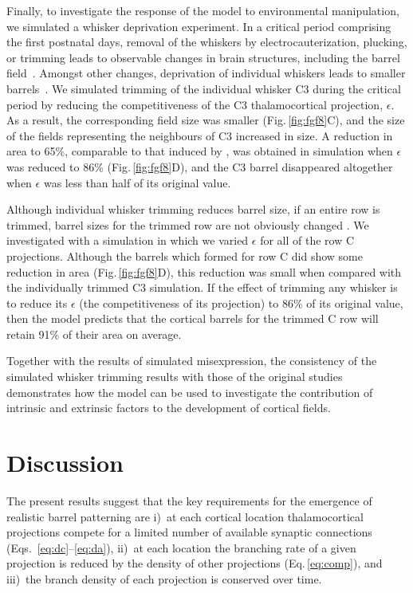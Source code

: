 \documentclass[9pt,lineno]{elife}
\newcommand{\MPthreePred}[1]{\textcolor{colmpthreepred}{#1}}
\begin{document}
\MPthreePred{Finally, to investigate the response of the model to
  environmental manipulation, we simulated a whisker deprivation
  experiment. In a critical period comprising the first postnatal days,
  removal of the whiskers by electrocauterization, plucking, or trimming leads
  to observable changes in brain structures, including the barrel
  field~\citep{jeanmonod_mouse_1981}. Amongst other changes, deprivation of
  individual whiskers leads to smaller
  barrels~\citep{kossut_effects_1992}. We simulated
  trimming of the individual whisker C3 during the critical period by reducing
  the competitiveness of the C3 thalamocortical projection, $\epsilon$. As a
  result, the corresponding field size was smaller (Fig.\,\ref{fig:fgf8}C),
  and the size of the fields representing the neighbours of C3 increased in
  size. A reduction in area to 65\%, comparable to that induced by
  \cite{kossut_effects_1992}, was obtained in simulation when $\epsilon$
  was reduced to 86\% (Fig.\,\ref{fig:fgf8}D), and the C3 barrel disappeared
  altogether when $\epsilon$ was less than half of its original value.}

\MPthreePred{Although individual whisker trimming reduces barrel size, if an
  entire row is trimmed, barrel sizes for the trimmed row are not obviously
  changed \citep{land_metabolic_1985}. We investigated with a simulation in
  which we varied $\epsilon$ for all of the row C projections.  Although the
  barrels which formed for row C did show some reduction in area
  (Fig.\,\ref{fig:fgf8}D), this reduction was small when compared with the
  individually trimmed C3 simulation. If the effect of trimming any whisker is
  to reduce its $\epsilon$ (the competitiveness of its projection) to 86\% of
  its original value, then the model predicts that the cortical barrels for
  the trimmed C row will retain 91\% of their area on average.}

\MPthreePred{Together with the results of simulated misexpression, the
  consistency of the simulated whisker trimming results with those of the
  original studies demonstrates how the model can be used to investigate the
  contribution of intrinsic and extrinsic factors to the development of
  cortical fields.}

\section{Discussion}

The present results suggest that the key requirements for the emergence of
realistic barrel patterning are i)~at each cortical location thalamocortical
projections compete for a limited number of available synaptic connections
(Eqs.~\ref{eq:dc}--\ref{eq:da}), ii)~at each location the branching rate of a
given projection is reduced by the density of other projections
(Eq.\,\ref{eq:comp}), and iii)~the branch density of each projection is
conserved over time.
\end{document}
